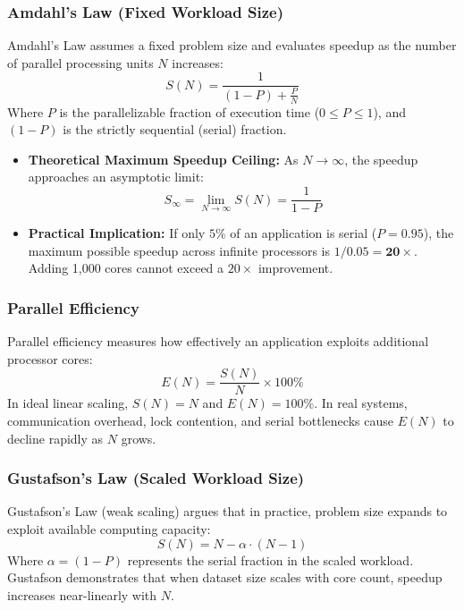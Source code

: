 \subsubsection{Amdahl's Law (Fixed Workload Size)}
Amdahl's Law assumes a fixed problem size and evaluates speedup as the number of parallel processing units $N$ increases:
\begin{equation}
\boxed{S(N) = \frac{1}{(1 - P) + \frac{P}{N}}}
\end{equation}
Where $P$ is the parallelizable fraction of execution time ($0 \le P \le 1$), and $(1 - P)$ is the strictly sequential (serial) fraction.
\begin{itemize}
    \item \textbf{Theoretical Maximum Speedup Ceiling:} As $N \to \infty$, the speedup approaches an asymptotic limit:
    \begin{equation}
    S_{\infty} = \lim_{N \to \infty} S(N) = \frac{1}{1 - P}
    \end{equation}
    \item \textbf{Practical Implication:} If only $5\%$ of an application is serial ($P = 0.95$), the maximum possible speedup across infinite processors is $1 / 0.05 = \mathbf{20\times}$. Adding 1,000 cores cannot exceed a $20\times$ improvement.
\end{itemize}

\subsubsection{Parallel Efficiency}
Parallel efficiency measures how effectively an application exploits additional processor cores:
\begin{equation}
\boxed{E(N) = \frac{S(N)}{N} \times 100\%}
\end{equation}
In ideal linear scaling, $S(N) = N$ and $E(N) = 100\%$. In real systems, communication overhead, lock contention, and serial bottlenecks cause $E(N)$ to decline rapidly as $N$ grows.

\subsubsection{Gustafson's Law (Scaled Workload Size)}
Gustafson's Law (weak scaling) argues that in practice, problem size expands to exploit available computing capacity:
\begin{equation}
\boxed{S(N) = N - \alpha \cdot (N - 1)}
\end{equation}
Where $\alpha = (1 - P)$ represents the serial fraction in the scaled workload. Gustafson demonstrates that when dataset size scales with core count, speedup increases near-linearly with $N$.

